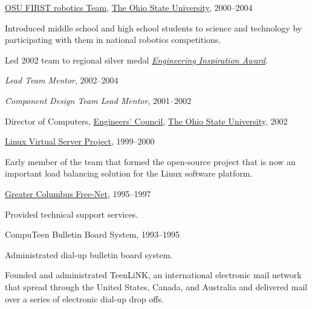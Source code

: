 \documentclass{article}
\newcommand{\halfblankline}{\quad\vspace{-0.5\baselineskip}\pagebreak[3]}
\begin{document}
\halfblankline

\href{http://www.osufirst.org/}{OSU FIRST robotics Team},
\href{http://www.osu.edu}{The Ohio State University}, 2000--2004
\begin{innerlist}
\item Introduced middle school and high school students to science and
        technology by participating with them in national robotics
        competitions.
\item Led 2002 team to regional silver medal
        \href{http://www.firstwiki.org/Engineering_Inspiration_Award}
             {\emph{Engineering Inspiration Award}}.
\item \emph{Lead Team Mentor}, 2002--2004
\item \emph{Component Design Team Lead Mentor}, 2001--2002
\end{innerlist}

\halfblankline

Director of Computers,
\href{http://ec.osu.edu/}{Engineers' Council},
\href{http://www.osu.edu/}{The Ohio State University}, 2002

\halfblankline

\href{http://www.linuxvirtualserver.org/}
     {Linux Virtual Server Project}, 1999--2000
\begin{innerlist}
\item Early member of the team that formed the open-source project that
        is now an important load balancing solution for the Linux
        software platform.
\end{innerlist}

\halfblankline

\href{http://www.gcfn.org/}
     {Greater Columbus Free-Net}, 1995--1997
\begin{innerlist}
\item Provided technical support services.
\end{innerlist}

\halfblankline

CompuTeen Bulletin Board System, 1993--1995
\begin{innerlist}
\item Administrated dial-up bulletin board system.
\item Founded and administrated TeenLiNK, an international electronic
        mail network that spread through the United States, Canada, and
        Australia and delivered mail over a series of electronic dial-up
        drop offs.
\end{innerlist}
\end{document}
